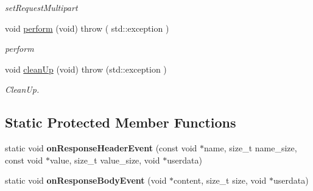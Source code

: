 \begin{DoxyCompactItemize}
\begin{DoxyCompactList}\small\item\em set\+Request\+Multipart \end{DoxyCompactList}\item 
void \hyperlink{classNetwork_1_1HTTP2_1_1NgHTTP2Handler_a0ffcd7addf3ea2dc9467312e3a45efff}{perform} (void)  throw ( std\+::exception )
\begin{DoxyCompactList}\small\item\em perform \end{DoxyCompactList}\item 
void \hyperlink{classNetwork_1_1HTTP2_1_1NgHTTP2Handler_a9ab6663ad62320d8588733aa9f467ace}{clean\+Up} (void)  throw (std\+::exception )
\begin{DoxyCompactList}\small\item\em Clean\+Up. \end{DoxyCompactList}\end{DoxyCompactItemize}
\subsection*{Static Protected Member Functions}
\begin{DoxyCompactItemize}
\item 
\mbox{\label{classNetwork_1_1HTTP2_1_1NgHTTP2Handler_ae42b5d3aca9bc746770bb73af2a0f727}} 
static void {\bfseries on\+Response\+Header\+Event} (const void $\ast$name, size\+\_\+t name\+\_\+size, const void $\ast$value, size\+\_\+t value\+\_\+size, void $\ast$userdata)
\item 
\mbox{\label{classNetwork_1_1HTTP2_1_1NgHTTP2Handler_acbed6056981ee0302bd24c86d1985319}} 
static void {\bfseries on\+Response\+Body\+Event} (void $\ast$content, size\+\_\+t size, void $\ast$userdata)
\end{DoxyCompactItemize}
